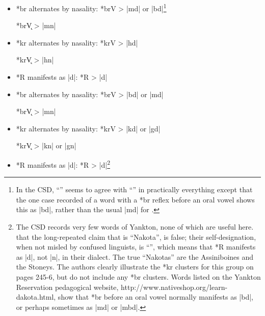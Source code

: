 \documentclass[output=paper]{LSP/langsci}
\begin{document}
\begin{itemize}
\item  *br alternates by nasality: \hspace{1em} *brV		>	|md| or |bd|\footnote{In the CSD, ``'' seems to agree with ``'' in practically everything except that the one case recorded of a  word with a *br reflex before an oral vowel shows this as |bd|, rather than the usual |md| for .}

\hspace{12em} *br\k{V}	>	|mn|

\item  *kr alternates by nasality:  \hspace{1.2em} *krV       >          |hd|

\hspace{12em} *kr\k{V}	>	|hn|

\item *R manifests as |d|: \hspace{4.5em} *R	>	|d|
\end{itemize}


\begin{itemize}
\item *br alternates by nasality: \hspace{1em} *brV	>	|bd| or |md|

\hspace{12em} *br\k{V} 	>	|mn|
\item  *kr alternates by nasality:  \hspace{1.2em} *krV       >          |kd| or |gd|

\hspace{12em} *kr\k{V} 	>	|kn| or |gn|

\item *R manifests as |d|: \hspace{4.5em} *R	>	|d|\footnote{The CSD records very few words of Yankton, none of which are useful here.  \citet{ParksDeMallie1992}  that the long-repeated claim that  is ``Nakota'', is false; their self-designation, when not misled by confused linguists, is ``'', which means that *R manifests as |d|, not |n|, in their dialect.  The true ``Nakotas'' are the Assiniboines and the Stoneys.  The authors clearly illustrate the *kr clusters for this group on pages 245-6, but do not include any *br clusters.  Words listed on the Yankton Reservation pedagogical website, http://www.nativeshop.org/learn-dakota.html, show that *br before an oral vowel normally manifests as |bd|, or perhaps sometimes as |md| or |mbd|.}
\end{itemize}
\end{document}
